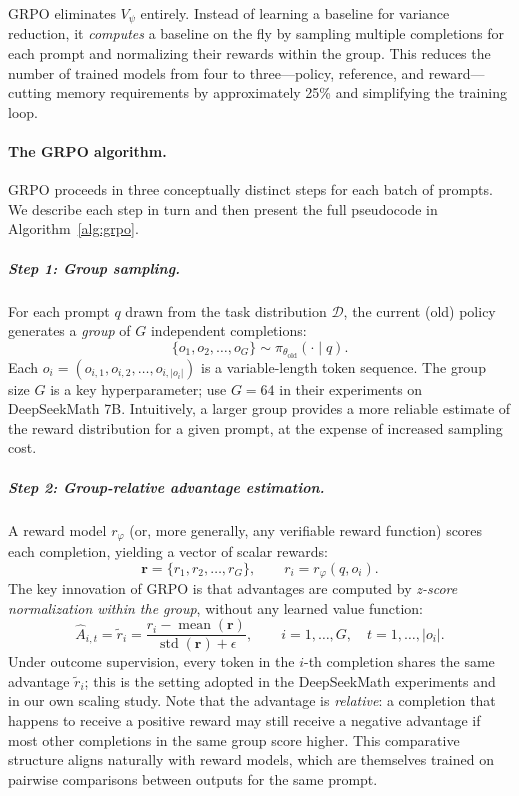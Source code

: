 \noindent
GRPO eliminates $V_\psi$ entirely.  Instead of learning a baseline for
variance reduction, it \emph{computes} a baseline on the fly by sampling
multiple completions for each prompt and normalizing their rewards
within the group.  This reduces the number of trained models from four to
three---policy, reference, and reward---cutting memory requirements by
approximately 25\% and simplifying the training loop.

\paragraph{The GRPO algorithm.}
GRPO proceeds in three conceptually distinct steps for each batch of
prompts.  We describe each step in turn and then present the full
pseudocode in Algorithm~\ref{alg:grpo}.

\subparagraph{Step 1: Group sampling.}
For each prompt $q$ drawn from the task distribution $\mathcal{D}$, the
current (old) policy generates a \emph{group} of $G$ independent
completions:
\begin{equation}
\label{eq:grpo-sampling}
\{o_1, o_2, \ldots, o_G\} \sim \pi_{\theta_{\text{old}}}(\cdot \mid q).
\end{equation}
Each $o_i = (o_{i,1}, o_{i,2}, \ldots, o_{i,|o_i|})$ is a variable-length
token sequence.  The group size $G$ is a key hyperparameter;
\cite{shao2024deepseekmath} use $G = 64$ in their experiments on
DeepSeekMath 7B.  Intuitively, a larger group provides a more reliable
estimate of the reward distribution for a given prompt, at the expense of
increased sampling cost.

\subparagraph{Step 2: Group-relative advantage estimation.}
A reward model $r_\varphi$ (or, more generally, any verifiable reward
function) scores each completion, yielding a vector of scalar rewards:
\begin{equation}
\label{eq:grpo-rewards}
\mathbf{r} = \{r_1, r_2, \ldots, r_G\},
\qquad r_i = r_\varphi(q, o_i).
\end{equation}
The key innovation of GRPO is that advantages are computed by
\emph{z-score normalization within the group}, without any learned value
function:
\begin{equation}
\label{eq:grpo-advantage}
\boxed{
\hat{A}_{i,t} = \tilde{r}_i
  = \frac{r_i - \operatorname{mean}(\mathbf{r})}
         {\operatorname{std}(\mathbf{r})+\epsilon},
\qquad i = 1, \ldots, G,
\quad t = 1, \ldots, |o_i|.}
\end{equation}
Under outcome supervision, every token in the $i$-th completion shares the
same advantage $\tilde{r}_i$; this is the setting adopted in the
DeepSeekMath experiments and in our own scaling study.  Note that the
advantage is \emph{relative}: a completion that happens to receive a
positive reward may still receive a negative advantage if most other
completions in the same group score higher.  This comparative structure
aligns naturally with reward models, which are themselves trained on
pairwise comparisons between outputs for the same prompt.

